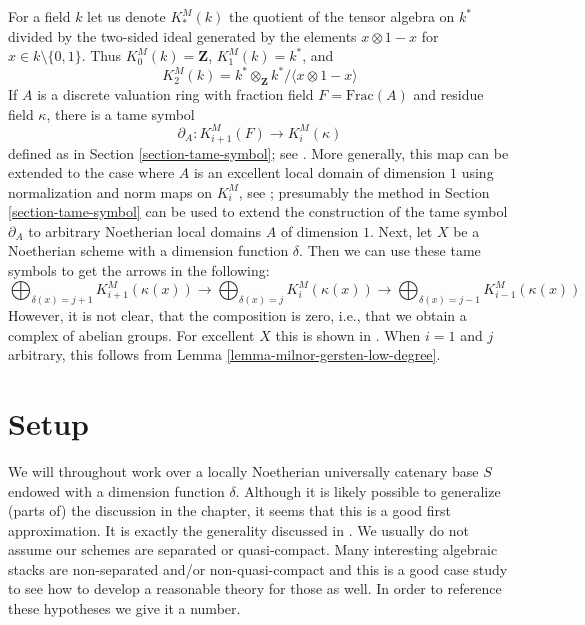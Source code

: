 \begin{remark}
\label{remark-gersten-complex-milnor}
For a field $k$ let us denote $K^M_*(k)$ the quotient of
the tensor algebra on $k^*$ divided by the two-sided ideal
generated by the elements $x \otimes 1 - x$ for $x \in k \setminus \{0, 1\}$.
Thus $K^M_0(k) = \mathbf{Z}$, $K_1^M(k) = k^*$, and
$$
K^M_2(k) = k^* \otimes_\mathbf{Z} k^* / \langle x \otimes 1 - x \rangle
$$
If $A$ is a discrete valuation ring with fraction field $F = \text{Frac}(A)$
and residue field $\kappa$, there is a tame symbol
$$
\partial_A : K_{i + 1}^M(F) \to K_i^M(\kappa)
$$
defined as in Section \ref{section-tame-symbol}; see \cite{Kato-Milnor-K}.
More generally, this map can be extended to the case where $A$ is an
excellent local domain of dimension $1$ using normalization and norm
maps on $K_i^M$, see \cite{Kato-Milnor-K}; presumably the method in
Section \ref{section-tame-symbol} can be used to extend the construction
of the tame symbol $\partial_A$ to arbitrary Noetherian local domains $A$
of dimension $1$. Next, let $X$ be a Noetherian scheme with a
dimension function $\delta$. Then we can use these tame symbols to get
the arrows in the following:
$$
\bigoplus\nolimits_{\delta(x) = j + 1} K^M_{i + 1}(\kappa(x))
\longrightarrow
\bigoplus\nolimits_{\delta(x) = j} K^M_i(\kappa(x))
\longrightarrow
\bigoplus\nolimits_{\delta(x) = j - 1} K^M_{i - 1}(\kappa(x))
$$
However, it is not clear, that the composition is zero, i.e., that
we obtain a complex of abelian groups.
For excellent $X$ this is shown in \cite{Kato-Milnor-K}.
When $i = 1$ and $j$ arbitrary, this follows from
Lemma \ref{lemma-milnor-gersten-low-degree}.
\end{remark}





















\section{Setup}
\label{section-setup}

\noindent
We will throughout work over a locally Noetherian universally
catenary base $S$ endowed with a dimension function $\delta$.
Although it is likely possible to generalize (parts of) the
discussion in the chapter, it seems that this is a good first
approximation. It is exactly the generality discussed in \cite{Thorup}.
We usually do not assume our schemes are
separated or quasi-compact. Many interesting algebraic stacks
are non-separated and/or non-quasi-compact and this is a good
case study to see how to develop a reasonable theory for those as well.
In order to reference these hypotheses we give it a number.

